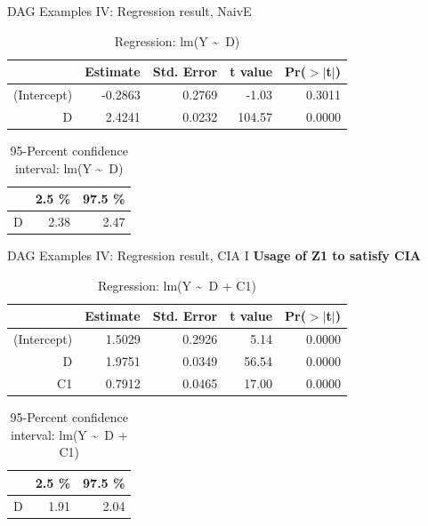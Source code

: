 \documentclass{beamer}\usepackage[]{graphicx}\usepackage[]{color}
\begin{document}
\begin{frame}[fragile]{DAG Examples IV: Regression result, NaivE}
\begin{table}[ht]
\centering
\begingroup\small
\begin{tabular}{rrrrr}
  \hline
 & Estimate & Std. Error & t value & Pr($>$$|$t$|$) \\ 
  \hline
(Intercept) & -0.2863 & 0.2769 & -1.03 & 0.3011 \\ 
  D & 2.4241 & 0.0232 & 104.57 & 0.0000 \\ 
   \hline
\end{tabular}
\endgroup
\caption{Regression: lm(Y \textasciitilde ~D)} 
\end{table}
\begin{table}[ht]
\centering
\begingroup\small
\begin{tabular}{rrr}
  \hline
 & 2.5 \% & 97.5 \% \\ 
  \hline
D & 2.38 & 2.47 \\ 
   \hline
\end{tabular}
\endgroup
\caption{95-Percent confidence interval: lm(Y \textasciitilde ~D)} 
\end{table}

\end{frame}

\begin{frame}[fragile]{DAG Examples IV: Regression result, CIA I}
\textbf{Usage of Z1 to satisfy CIA}
\begin{table}[ht]
\centering
\begingroup\small
\begin{tabular}{rrrrr}
  \hline
 & Estimate & Std. Error & t value & Pr($>$$|$t$|$) \\ 
  \hline
(Intercept) & 1.5029 & 0.2926 & 5.14 & 0.0000 \\ 
  D & 1.9751 & 0.0349 & 56.54 & 0.0000 \\ 
  C1 & 0.7912 & 0.0465 & 17.00 & 0.0000 \\ 
   \hline
\end{tabular}
\endgroup
\caption{Regression: lm(Y \textasciitilde ~D + C1)} 
\end{table}
\begin{table}[ht]
\centering
\begingroup\small
\begin{tabular}{rrr}
  \hline
 & 2.5 \% & 97.5 \% \\ 
  \hline
D & 1.91 & 2.04 \\ 
   \hline
\end{tabular}
\endgroup
\caption{95-Percent confidence interval: lm(Y \textasciitilde ~D + C1)} 
\end{table}

\end{frame}
\end{document}
